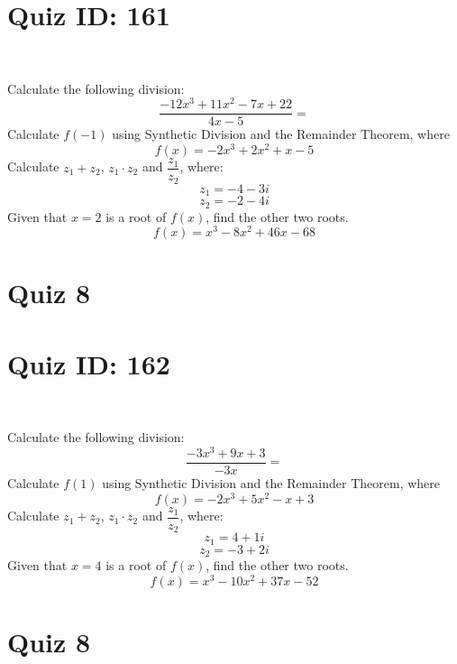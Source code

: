 \documentclass{exam}
\begin{document}
\section*{Quiz ID: 161}
\vspace{0.5cm}\
\vspace{1cm}\
\begin{questions}
\question Calculate the following division:\[\dfrac{
-12x^3 + 11x^2 - 7x + 22}{
4x - 5}=\] \makeemptybox{\stretch{2}}
\question Calculate $f(-1)$ using Synthetic Division and the Remainder Theorem, where\[f(x) = 
-2x^3 + 2x^2 + x - 5\]
\newpage\question Calculate $z_1+z_2$, $z_1\cdot z_2$ and $\dfrac{z_1}{z_2}$, where:\[z_1=-4-3\mathit{i}\]\[z_2=-2-4\mathit{i}\]
\question Given that $x=2$ is a root of $f(x)$, find the other two roots.\[f(x)=
x^3 - 8x^2 + 46x - 68\]\makeemptybox{\stretch{1}}
\end{questions}\newpage
\newpage
\section*{Quiz 8}
\section*{Quiz ID: 162}
\vspace{0.5cm}\
\vspace{1cm}\
\begin{questions}
\question Calculate the following division:\[\dfrac{
-3x^3 + 9x + 3}{
-3x}=\] 
\question Calculate $f(1)$ using Synthetic Division and the Remainder Theorem, where\[f(x) = 
-2x^3 + 5x^2 - x + 3\]
\newpage\question Calculate $z_1+z_2$, $z_1\cdot z_2$ and $\dfrac{z_1}{z_2}$, where:\[z_1=4+1\mathit{i}\]\[z_2=-3+2\mathit{i}\]\makeemptybox{\stretch{1}}
\question Given that $x=4$ is a root of $f(x)$, find the other two roots.\[f(x)=
x^3 - 10x^2 + 37x - 52\]\makeemptybox{\stretch{1}}
\end{questions}\newpage
\newpage
\section*{Quiz 8}
\end{document}
